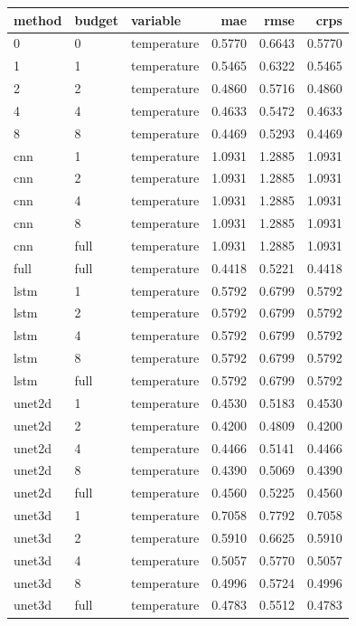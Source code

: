 \begin{tabular}{lllrrr}
\toprule
method & budget & variable & mae & rmse & crps \\
\midrule
0 & 0 & temperature & 0.5770 & 0.6643 & 0.5770 \\
1 & 1 & temperature & 0.5465 & 0.6322 & 0.5465 \\
2 & 2 & temperature & 0.4860 & 0.5716 & 0.4860 \\
4 & 4 & temperature & 0.4633 & 0.5472 & 0.4633 \\
8 & 8 & temperature & 0.4469 & 0.5293 & 0.4469 \\
cnn & 1 & temperature & 1.0931 & 1.2885 & 1.0931 \\
cnn & 2 & temperature & 1.0931 & 1.2885 & 1.0931 \\
cnn & 4 & temperature & 1.0931 & 1.2885 & 1.0931 \\
cnn & 8 & temperature & 1.0931 & 1.2885 & 1.0931 \\
cnn & full & temperature & 1.0931 & 1.2885 & 1.0931 \\
full & full & temperature & 0.4418 & 0.5221 & 0.4418 \\
lstm & 1 & temperature & 0.5792 & 0.6799 & 0.5792 \\
lstm & 2 & temperature & 0.5792 & 0.6799 & 0.5792 \\
lstm & 4 & temperature & 0.5792 & 0.6799 & 0.5792 \\
lstm & 8 & temperature & 0.5792 & 0.6799 & 0.5792 \\
lstm & full & temperature & 0.5792 & 0.6799 & 0.5792 \\
unet2d & 1 & temperature & 0.4530 & 0.5183 & 0.4530 \\
unet2d & 2 & temperature & 0.4200 & 0.4809 & 0.4200 \\
unet2d & 4 & temperature & 0.4466 & 0.5141 & 0.4466 \\
unet2d & 8 & temperature & 0.4390 & 0.5069 & 0.4390 \\
unet2d & full & temperature & 0.4560 & 0.5225 & 0.4560 \\
unet3d & 1 & temperature & 0.7058 & 0.7792 & 0.7058 \\
unet3d & 2 & temperature & 0.5910 & 0.6625 & 0.5910 \\
unet3d & 4 & temperature & 0.5057 & 0.5770 & 0.5057 \\
unet3d & 8 & temperature & 0.4996 & 0.5724 & 0.4996 \\
unet3d & full & temperature & 0.4783 & 0.5512 & 0.4783 \\
\bottomrule
\end{tabular}

